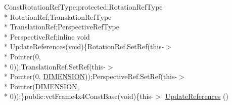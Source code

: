 \begin{DoxyCompactItemize}
 Const\-Rotation\-Ref\-Type;protected\-:\-Rotation\-Ref\-Type \\*
Rotation\-Ref;Translation\-Ref\-Type \\*
Translation\-Ref;Perspective\-Ref\-Type \\*
Perspective\-Ref;inline void \\*
Update\-References(void)\{Rotation\-Ref.\-Set\-Ref(this-\/$>$\\*
Pointer(0, \\*
0));Translation\-Ref.\-Set\-Ref(this-\/$>$\\*
Pointer(0, \hyperlink{classvct_frame4x4_const_base_aa9000d4539e9ab27b091692d4bd0d986a97d7212e6c46dc9acbbd11bbc573d9a0}{D\-I\-M\-E\-N\-S\-I\-O\-N}));Perspective\-Ref.\-Set\-Ref(this-\/$>$\\*
Pointer(\hyperlink{classvct_frame4x4_const_base_aa9000d4539e9ab27b091692d4bd0d986a97d7212e6c46dc9acbbd11bbc573d9a0}{D\-I\-M\-E\-N\-S\-I\-O\-N}, \\*
0));\}public\-:vct\-Frame4x4\-Const\-Base(void)\{this-\/$>$ \hyperlink{classvct_frame4x4_const_base_aabe7499444284102317fe1af3a3f6978}{Update\-References} ()
\end{DoxyCompactItemize}
